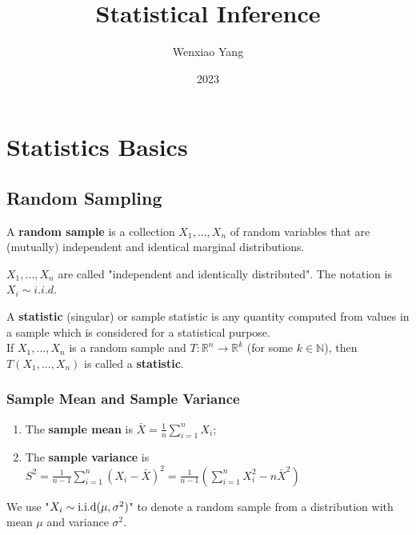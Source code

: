 \documentclass[11pt]{elegantbook}
\title{Statistical Inference}
\author{Wenxiao Yang}
\institute{Haas School of Business, University of California Berkeley}
\date{2023}
\begin{document}
\maketitle

\frontmatter

\mainmatter

\chapter{Statistics Basics}
\section{Random Sampling}
\begin{definition}
    \normalfont
    A \textbf{random sample} is a collection $X_1,...,X_n$ of random variables that are (mutually) independent and identical marginal distributions.

    $X_1,...,X_n$ are called "independent and identically distributed". The notation is $X_i\sim i.i.d. $
\end{definition}

\begin{definition}[Statistic]
    \normalfont
    A \textbf{statistic} (singular) or sample statistic is any quantity computed from values in a sample which is considered for a statistical purpose.\\
    If $X_1,...,X_n$ is a random sample and $T: \mathbb{R}^n \rightarrow \mathbb{R}^k$ (for some $k\in \mathbb{N}$), then $T(X_1,...,X_n)$ is called a \textbf{statistic}.
\end{definition}

\subsection{Sample Mean and Sample Variance}
\begin{definition}
    \normalfont
    \begin{enumerate}
        \item The \textbf{sample mean} is $\bar{X}=\frac{1}{n}\sum_{i=1}^n X_i$;
        \item The \textbf{sample variance} is $S^2=\frac{1}{n-1}\sum_{i=1}^n (X_i-\bar{X})^2=\frac{1}{n-1}(\sum_{i=1}^n X_i^2 - n\bar{X}^2)$
    \end{enumerate}
\end{definition}

\begin{note}
    We use "$X_i\sim \textnormal{i.i.d}(\mu,\sigma^2)$" to denote a random sample from a distribution with mean $\mu$ and variance $\sigma^2$.
\end{note}
\end{document}
